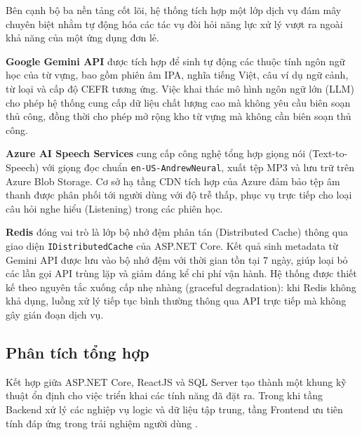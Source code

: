 Bên cạnh bộ ba nền tảng cốt lõi, hệ thống tích hợp một lớp dịch vụ đám mây chuyên biệt nhằm tự động hóa các tác vụ đòi hỏi năng lực xử lý vượt ra ngoài khả năng của một ứng dụng đơn lẻ.

\textbf{Google Gemini API} được tích hợp để sinh tự động các thuộc tính ngôn ngữ học của từ vựng, bao gồm phiên âm IPA, nghĩa tiếng Việt, câu ví dụ ngữ cảnh, từ loại và cấp độ CEFR tương ứng. Việc khai thác mô hình ngôn ngữ lớn (LLM) cho phép hệ thống cung cấp dữ liệu chất lượng cao mà không yêu cầu biên soạn thủ công, đồng thời cho phép mở rộng kho từ vựng mà không cần biên soạn thủ công.

\textbf{Azure AI Speech Services} cung cấp công nghệ tổng hợp giọng nói (Text-to-Speech) với giọng đọc chuẩn \texttt{en-US-AndrewNeural}, xuất tệp MP3 và lưu trữ trên Azure Blob Storage. Cơ sở hạ tầng CDN tích hợp của Azure đảm bảo tệp âm thanh được phân phối tới người dùng với độ trễ thấp, phục vụ trực tiếp cho loại câu hỏi nghe hiểu (Listening) trong các phiên học.

\textbf{Redis} đóng vai trò là lớp bộ nhớ đệm phân tán (Distributed Cache) thông qua giao diện \texttt{IDistributedCache} của ASP.NET Core. Kết quả sinh metadata từ Gemini API được lưu vào bộ nhớ đệm với thời gian tồn tại 7 ngày, giúp loại bỏ các lần gọi API trùng lặp và giảm đáng kể chi phí vận hành. Hệ thống được thiết kế theo nguyên tắc xuống cấp nhẹ nhàng (graceful degradation): khi Redis không khả dụng, luồng xử lý tiếp tục bình thường thông qua API trực tiếp mà không gây gián đoạn dịch vụ.

\subsection{Phân tích tổng hợp}

Kết hợp giữa ASP.NET Core, ReactJS và SQL Server tạo thành một khung kỹ thuật ổn định cho việc triển khai các tính năng đã đặt ra. Trong khi tầng Backend xử lý các nghiệp vụ logic và dữ liệu tập trung, tầng Frontend ưu tiên tính đáp ứng trong trải nghiệm người dùng \cite{TechEmpower2024}.




